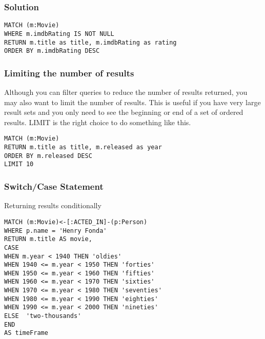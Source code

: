 \begin{frame}[fragile]\frametitle{Solution}

\begin{lstlisting}
MATCH (m:Movie)
WHERE m.imdbRating IS NOT NULL
RETURN m.title as title, m.imdbRating as rating
ORDER BY m.imdbRating DESC
\end{lstlisting}

\end{frame}

\begin{frame}[fragile]\frametitle{Limiting the number of results}

Although you can filter queries to reduce the number of results returned, you may also want to limit the number of results. This is useful if you have very large result sets and you only need to see the beginning or end of a set of ordered results. LIMIT is the right choice to do something like this.

\begin{lstlisting}
MATCH (m:Movie)
RETURN m.title as title, m.released as year
ORDER BY m.released DESC
LIMIT 10
\end{lstlisting}


\end{frame}

\begin{frame}[fragile]\frametitle{Switch/Case Statement}

Returning results conditionally

\begin{lstlisting}
MATCH (m:Movie)<-[:ACTED_IN]-(p:Person)
WHERE p.name = 'Henry Fonda'
RETURN m.title AS movie,
CASE
WHEN m.year < 1940 THEN 'oldies'
WHEN 1940 <= m.year < 1950 THEN 'forties'
WHEN 1950 <= m.year < 1960 THEN 'fifties'
WHEN 1960 <= m.year < 1970 THEN 'sixties'
WHEN 1970 <= m.year < 1980 THEN 'seventies'
WHEN 1980 <= m.year < 1990 THEN 'eighties'
WHEN 1990 <= m.year < 2000 THEN 'nineties'
ELSE  'two-thousands'
END
AS timeFrame
\end{lstlisting}
\end{frame}

